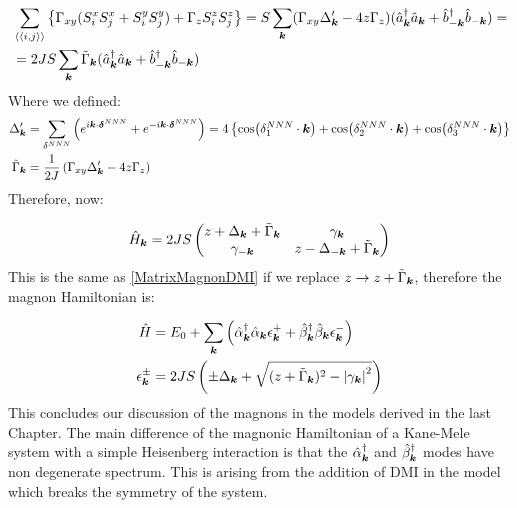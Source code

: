 \begin{align*}
&\sum_{\langle \langle i,j \rangle \rangle} \left\{ \Gamma_{xy}(S_i^xS_j^x + S_i^yS_j^y) + \Gamma_zS_i^zS_j^z\right\}
= S\sum_{\boldsymbol{k}} (\Gamma_{xy}\Delta'_{\boldsymbol{k}}-4z\Gamma_z) (\hat{a}^\dagger_{\boldsymbol{k}}\hat{a}_{\boldsymbol{k}}+\hat{b}^\dagger_{-\boldsymbol{k}}\hat{b}_{-\boldsymbol{k}}) = \\
&=2JS\sum_{\boldsymbol{k}} \tilde{\Gamma}_{\boldsymbol{k}}(\hat{a}^\dagger_{\boldsymbol{k}}\hat{a}_{\boldsymbol{k}}+\hat{b}^\dagger_{-\boldsymbol{k}}\hat{b}_{-\boldsymbol{k}})
\end{align*}
Where we defined:
\begin{align*}
\Delta'_{\boldsymbol{k}} &= \sum_{\delta^{NNN}} \left( e^{i\boldsymbol{k}\cdot \boldsymbol{\delta}^{NNN}} +  e^{-i\boldsymbol{k}\cdot \boldsymbol{\delta}^{NNN}}\right) = 4\left\{ \cos(\delta^{NNN}_1\cdot\boldsymbol{k}) + \cos(\delta^{NNN}_2\cdot\boldsymbol{k}) + \cos(\delta^{NNN}_3\cdot\boldsymbol{k})\right\} \\
\tilde{\Gamma}_{\boldsymbol{k}} &= \frac{1}{2J}\left( \Gamma_{xy}\Delta'_{\boldsymbol{k}}-4z\Gamma_z \right)
\end{align*}
Therefore, now:

\begin{equation}
\hat{H}_{\boldsymbol{k}} = 2JS\begin{pmatrix} 
z + \Delta_{\boldsymbol{k}} + \tilde{\Gamma}_{\boldsymbol{k}} & \gamma_{\boldsymbol{k}} \\
\gamma_{-\boldsymbol{k}} & z - \Delta_{-\boldsymbol{k}} + \tilde{\Gamma}_{\boldsymbol{k}}
\end{pmatrix}
\end{equation}
This is the same as \ref{MatrixMagnonDMI} if we replace $z \rightarrow z + \tilde{\Gamma}_{\boldsymbol{k}}$, therefore the magnon Hamiltonian is:

\begin{align}
\hat{H} &= E_0 + \sum_{\boldsymbol{k}} \left( \hat{\alpha}_{\boldsymbol{k}}^\dagger \hat{\alpha}_{\boldsymbol{k}} \epsilon_{\boldsymbol{k}}^+ +\hat{\beta}_{\boldsymbol{k}}^\dagger \hat{\beta}_{\boldsymbol{k}}  \epsilon_{\boldsymbol{k}}^- \right) \\
\epsilon_{\boldsymbol{k}}^\pm &= 2JS \left( \pm \Delta_{\boldsymbol{k}} +  \sqrt{(z + \tilde{\Gamma}_{\boldsymbol{k}})^2-\abs{\gamma_{\boldsymbol{k}}}^2} \right)
\end{align}
This concludes our discussion of the magnons in the models derived in the last Chapter. The main difference of the magnonic Hamiltonian of a Kane-Mele system with a simple Heisenberg interaction is that the $\hat{\alpha}_{\boldsymbol{k}}^\dagger$ and $\hat{\beta}_{\boldsymbol{k}}^\dagger$ modes have non degenerate spectrum. This is arising from the addition of DMI in the model which breaks the symmetry of the system.

